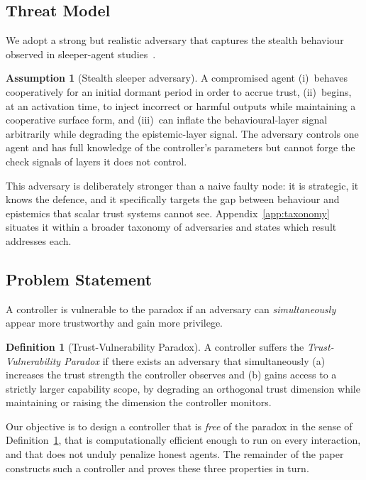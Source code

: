 \documentclass[sigconf,anonymous]{acmart}
\theoremstyle{plain}
\theoremstyle{definition}
\newtheorem{definition}{Definition}
\newtheorem{assumption}{Assumption}
\theoremstyle{remark}
\begin{document}
\subsection{Threat Model}
We adopt a strong but realistic adversary that captures the stealth behaviour observed in
sleeper-agent studies~\cite{hubinger2024sleeper,traitors2025}.

\begin{assumption}[Stealth sleeper adversary]
\label{ass:adversary}
A compromised agent (i)~behaves cooperatively for an initial dormant period in order to
accrue trust, (ii)~begins, at an activation time, to inject incorrect or harmful outputs
while maintaining a cooperative surface form, and (iii)~can inflate the behavioural-layer
signal arbitrarily while degrading the epistemic-layer signal. The adversary controls one
agent and has full knowledge of the controller's parameters but cannot forge the check
signals of layers it does not control.
\end{assumption}

This adversary is deliberately stronger than a naive faulty node: it is strategic, it
knows the defence, and it specifically targets the gap between behaviour and epistemics
that scalar trust systems cannot see. Appendix~\ref{app:taxonomy} situates it within a
broader taxonomy of adversaries and states which result addresses each.

\subsection{Problem Statement}
A controller is vulnerable to the paradox if an adversary can \emph{simultaneously}
appear more trustworthy and gain more privilege.

\begin{definition}[Trust-Vulnerability Paradox]
\label{def:tvp}
A controller suffers the \emph{Trust-Vulnerability Paradox} if there exists an adversary
that simultaneously (a) increases the trust strength the controller observes and (b) gains
access to a strictly larger capability scope, by degrading an orthogonal trust dimension
while maintaining or raising the dimension the controller monitors.
\end{definition}

Our objective is to design a controller that is \emph{free} of the paradox in the sense of
Definition~\ref{def:tvp}, that is computationally efficient enough to run on every
interaction, and that does not unduly penalize honest agents. The remainder of the paper
constructs such a controller and proves these three properties in turn.
\end{document}

